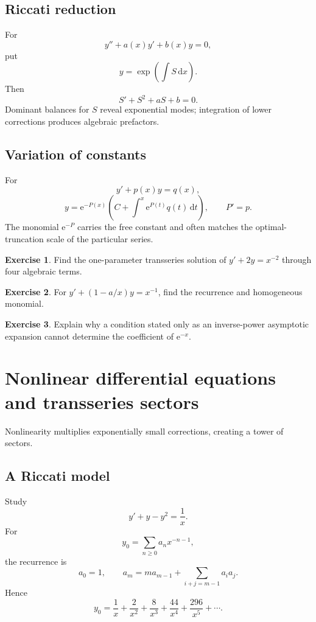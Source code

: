 \documentclass[11pt,oneside,openany]{book}
\newcommand{\e}{\mathrm{e}}
\newcommand{\dd}{\,\mathrm{d}}
\theoremstyle{plain}
\theoremstyle{definition}
\newtheorem{exercise}{Exercise}[chapter]
\theoremstyle{remark}
\begin{document}
\section{Riccati reduction}
For
\[
  y''+a(x)y'+b(x)y=0,
\]
put
\[
  y=\exp\left(\int S\dd x\right).
\]
Then
\[
  S'+S^2+aS+b=0.
\]
Dominant balances for $S$ reveal exponential modes; integration of lower corrections produces algebraic prefactors.

\section{Variation of constants}
For
\[
  y'+p(x)y=q(x),
\]
\[
  y=\e^{-P(x)}
  \left(C+\int^x\e^{P(t)}q(t)\dd t\right),
  \qquad P'=p.
\]
The monomial $\e^{-P}$ carries the free constant and often matches the optimal-truncation scale of the particular series.

\begin{exercise}
Find the one-parameter transseries solution of $y'+2y=x^{-2}$ through four algebraic terms.
\end{exercise}

\begin{exercise}
For $y'+(1-a/x)y=x^{-1}$, find the recurrence and homogeneous monomial.
\end{exercise}

\begin{exercise}
Explain why a condition stated only as an inverse-power asymptotic expansion cannot determine the coefficient of $\e^{-x}$.
\end{exercise}


\chapter[Nonlinear differential equations and transseries sectors]{Nonlinear differential equations\\and transseries sectors}
\label{ch:nonlinear-odes}

Nonlinearity multiplies exponentially small corrections, creating a tower of sectors.

\section{A Riccati model}
Study
\[
  y'+y-y^2=\frac1x.
\]
For
\[
  y_0=\sum_{n\ge0}a_nx^{-n-1},
\]
the recurrence is
\[
  a_0=1,
  \qquad
  a_m=ma_{m-1}+\sum_{i+j=m-1}a_i a_j.
\]
Hence
\[
  y_0=\frac1x+\frac2{x^2}+\frac8{x^3}
  +\frac{44}{x^4}+\frac{296}{x^5}+\cdots.
\]
\end{document}
